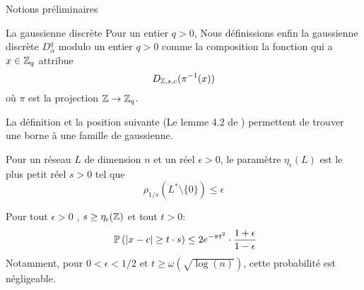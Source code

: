 \begin{section}{Notions préliminaires}
\begin{subsection}{La gaussienne discrète}
	Pour un entier $q > 0$,  
	Nous définissions enfin la gaussienne discrète $D^q_{\alpha}$ modulo un entier $q > 0$ comme la
		composition la fonction qui a $x \in \mathbb{Z}_q$ attribue   
		\[ D_{\mathbb{Z}, s, c}(\pi^{-1}(x)) \]
	où $\pi$ est la projection $\mathbb{Z} \rightarrow \mathbb{Z}_q$.

La définition et la position suivante 
(Le lemme 4.2 de \cite{STOC:GenPeiVai08})
permettent de trouver une borne à une famille de gaussienne.
\begin{definition}
Pour un réseau $L$ de dimension $n$ et un réel $\epsilon > 0$, 
	le paramètre $\eta_\epsilon(L)$ est le plus petit réel
	$s>0$ tel que 
	\[\rho_{1/s}(L^* \setminus \{0\}) \leq \epsilon\]
\end{definition}
	\begin{prop}
	Pour tout $\epsilon > 0$ , $s \geq \eta_{\epsilon}(\mathbb{Z})$ et tout
	$t>0$:
	\[ \PP\left(|x-c| \geq t\cdot s\right) \leq 2 e^{-\pi t^2}
	\cdot \frac{1+\epsilon}{1-\epsilon} \]
	Notamment, pour $0 < \epsilon  < 1/2$ et $t \geq \omega(\sqrt{\log(n)})$, cette probabilité est négligeable.
	\end{prop}
	\end{subsection}
\end{section}

